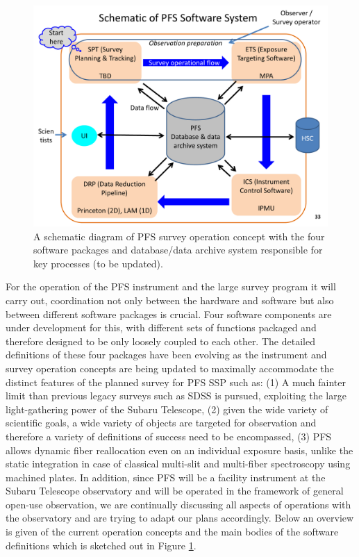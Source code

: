 \documentclass[a4paper]{article}
\begin{document}
\begin{figure}[!htb]
\begin{center}
\includegraphics[scale=0.5]{./figures/pfs_survey_operational_concept.pdf}
\end{center}
\caption{A schematic diagram of PFS survey operation concept with the
  four software packages and database/data archive system responsible
  for key processes (to be updated).\label{fig:pfs_survey_concept}}
\end{figure}

For the operation of the PFS instrument and the large survey program
it will carry out, coordination not only between the hardware and
software but also between different software packages is crucial. Four
software components are under development for this, with different
sets of functions packaged and therefore designed to be only loosely
coupled to each other. The detailed definitions of these four packages
have been evolving as the instrument and survey operation concepts are
being updated to maximally accommodate the distinct features of the
planned survey for PFS SSP such as: (1) A much fainter limit than
previous legacy surveys such as SDSS is pursued, exploiting the large
light-gathering power of the Subaru Telescope, (2) given the wide
variety of scientific goals, a wide variety of objects are targeted
for observation and therefore a variety of definitions of success need
to be encompassed, (3)
PFS allows dynamic fiber reallocation even on an individual exposure
basis, unlike the static integration in case of classical multi-slit
and multi-fiber spectroscopy using machined plates. In addition, since
PFS will be a facility instrument at the Subaru Telescope observatory
and will be operated in the framework of general open-use observation,
we are continually discussing all aspects of operations with the
observatory and are trying to adapt our plans accordingly. Below an
overview is given of the current operation concepts and the main
bodies of the software definitions which is sketched out in Figure
\ref{fig:pfs_survey_concept}.
\end{document}
